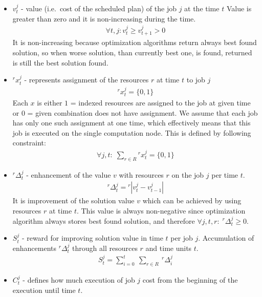 \begin{itemize}
	\item $v_{t}^{j}$ - value (i.e.\ cost of the scheduled plan) of the job $j$ at the time $t$
	      Value is greater than zero and it is non-increasing during the time. 
	      \begin{align*}
	      	\forall t, j: v_{t}^{j} \geq v_{t+1}^{j} > 0 
	      \end{align*}
	      It is non-increasing because optimization algorithms return always best found solution, 
	      so when worse solution, than currently best one, is found,
	      returned is still the best solution found.
	\item $^{r}x_{t}^{j}$ - represents assignment of the resources $r$ at time $t$ to job $j$
	      \begin{align*}
	      	^{r}x_{t}^{j} = \{0, 1\} 
	      \end{align*}
	      Each $x$ is either $1$ = indexed resources are assigned to the job at given time or $0$ = given combination does not have assignment.
	      We assume that each job has only one such assignment at one time,
	      which effectively means that this job is executed on the single computation node.
	      This is defined by following constraint:
	      \begin{align*}
	      	\forall j, t:\; \sum_{r \in R} {}^{r}x_{t}^{j} = \{0, 1\} 
	      \end{align*}
	\item $^{r}\Delta_{t}^{j}$ - enhancement of the value $v$ with resources $r$ on the job $j$ per time $t$.
	      \begin{align*}
	      	^{r}\Delta_{t}^{j} = {}^{r}| v_{t}^{j} - v_{t-1}^{j}| 
	      \end{align*}
	      It is improvement of the solution value $v$ which can be achieved by using resources $r$ at time $t$.
	      This value is always non-negative since optimization algorithm always stores best found solution,
	      and therefore $\forall j, t, r:\; {}^{r}\Delta_{t}^{j} \geq 0$. 
	\item $S_{t}^{j}$ - reward for improving solution value in time $t$ per job $j$.
	      Accumulation of enhancements $^{r}\Delta_{t}^{j}$ through all resources $r$ and time units $t$.
	      \begin{align*}
	      	S_{t}^{j} = \sum_{i = 0}^{t}\:\sum_{r \in R}\: {}^{r}\Delta_{i}^{j} 
	      \end{align*}
	\item $C_{t}^{j}$ - defines how much execution of job $j$ cost from the beginning of the execution until time $t$.

\end{itemize}
